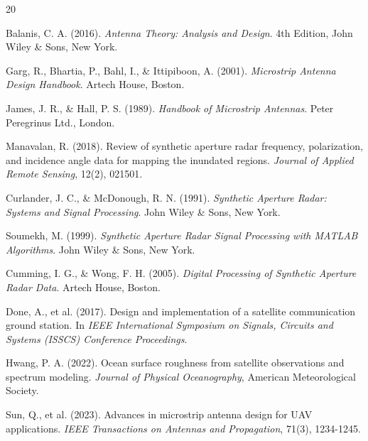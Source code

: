 \documentclass[12pt]{article}
\begin{document}
\begin{thebibliography}{20}

Balanis, C. A. (2016). \textit{Antenna Theory: Analysis and Design}. 4th Edition, John Wiley \& Sons, New York.

Garg, R., Bhartia, P., Bahl, I., \& Ittipiboon, A. (2001). \textit{Microstrip Antenna Design Handbook}. Artech House, Boston.

James, J. R., \& Hall, P. S. (1989). \textit{Handbook of Microstrip Antennas}. Peter Peregrinus Ltd., London.

Manavalan, R. (2018). Review of synthetic aperture radar frequency, polarization, and incidence angle data for mapping the inundated regions. \textit{Journal of Applied Remote Sensing}, 12(2), 021501.

Curlander, J. C., \& McDonough, R. N. (1991). \textit{Synthetic Aperture Radar: Systems and Signal Processing}. John Wiley \& Sons, New York.

Soumekh, M. (1999). \textit{Synthetic Aperture Radar Signal Processing with MATLAB Algorithms}. John Wiley \& Sons, New York.

Cumming, I. G., \& Wong, F. H. (2005). \textit{Digital Processing of Synthetic Aperture Radar Data}. Artech House, Boston.

Done, A., et al. (2017). Design and implementation of a satellite communication ground station. In \textit{IEEE International Symposium on Signals, Circuits and Systems (ISSCS) Conference Proceedings}.

Hwang, P. A. (2022). Ocean surface roughness from satellite observations and spectrum modeling. \textit{Journal of Physical Oceanography}, American Meteorological Society.

Sun, Q., et al. (2023). Advances in microstrip antenna design for UAV applications. \textit{IEEE Transactions on Antennas and Propagation}, 71(3), 1234-1245.

\end{thebibliography}
\end{document}
